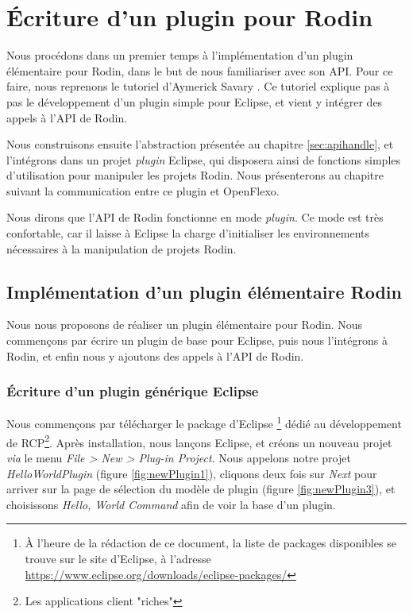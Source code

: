 \chapter{Écriture d'un plugin pour Rodin}

Nous procédons dans un premier temps à l'implémentation d'un plugin élémentaire pour Rodin, dans le but de nous familiariser avec son API.
Pour ce faire, nous reprenons le tutoriel d'Aymerick Savary \cite{asavary}.
Ce tutoriel explique pas à pas le développement d'un plugin simple pour Eclipse, et vient y intégrer des appels à l'API de Rodin.

Nous construisons ensuite l'abstraction présentée au chapitre \ref{sec:apihandle}, et l'intégrons dans un projet \textit{plugin} Eclipse, %
qui disposera ainsi de fonctions simples d'utilisation pour manipuler les projets Rodin.
Nous présenterons au chapitre suivant la communication entre ce plugin et OpenFlexo.

Nous dirons que l'API de Rodin fonctionne en mode \textit{plugin}.
Ce mode est très confortable, car il laisse à Eclipse la charge d'initialiser les environnements nécessaires à la manipulation de projets Rodin.


\section{Implémentation d'un plugin élémentaire Rodin}

Nous nous proposons de réaliser un plugin élémentaire pour Rodin.
Nous commençons par écrire un plugin de base pour Eclipse, puis nous l'intégrons à Rodin, et enfin nous y ajoutons des appels à l'API de Rodin.

\subsection{Écriture d'un plugin générique Eclipse}

Nous commençons par télécharger le package d'Eclipse
\footnote{À l'heure de la rédaction de ce document, la liste de packages disponibles se trouve sur le site d'Eclipse, %
à l'adresse \href{https://www.eclipse.org/downloads/eclipse-packages/}{https://www.eclipse.org/downloads/eclipse-packages/}
} dédié au développement de RCP\footnote{Les applications client "riches"}.
Après installation, nous lançons Eclipse, et créons un nouveau projet \textit{via} le menu \textit{File > New > Plug-in Project}.
Nous appelons notre projet \textit{HelloWorldPlugin} (figure \ref{fig:newPlugin1}), cliquons deux fois sur \textit{Next} pour arriver %
sur la page de sélection du modèle de plugin (figure \ref{fig:newPlugin3}), et choisissons \textit{Hello, World Command} afin de voir la base d'un plugin.


